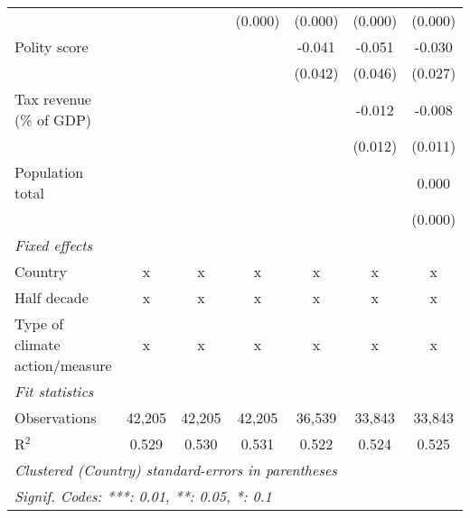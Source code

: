 \begin{tabular}{lcccccc}
                                                                          &               &               & (0.000)       & (0.000)        & (0.000)        & (0.000)\\   
   Polity score                                                           &               &               &               & -0.041         & -0.051         & -0.030\\   
                                                                          &               &               &               & (0.042)        & (0.046)        & (0.027)\\   
   Tax revenue (\% of GDP)                                                &               &               &               &                & -0.012         & -0.008\\   
                                                                          &               &               &               &                & (0.012)        & (0.011)\\   
   Population total                                                       &               &               &               &                &                & 0.000\\   
                                                                          &               &               &               &                &                & (0.000)\\   
   \emph{Fixed effects}\\
   Country                                                                & x             & x             & x             & x              & x              & x\\  
   Half decade                                                            & x             & x             & x             & x              & x              & x\\  
   Type of climate action/measure                                         & x             & x             & x             & x              & x              & x\\  
   \midrule \emph{Fit statistics}\\
   Observations                                                           & 42,205        & 42,205        & 42,205        & 36,539         & 33,843         & 33,843\\  
   R$^2$                                                                  & 0.529         & 0.530         & 0.531         & 0.522          & 0.524          & 0.525\\  
   \midrule
   \multicolumn{7}{l}{\emph{Clustered (Country) standard-errors in parentheses}}\\
   \multicolumn{7}{l}{\emph{Signif. Codes: ***: 0.01, **: 0.05, *: 0.1}}\\
\end{tabular}
\par\endgroup



